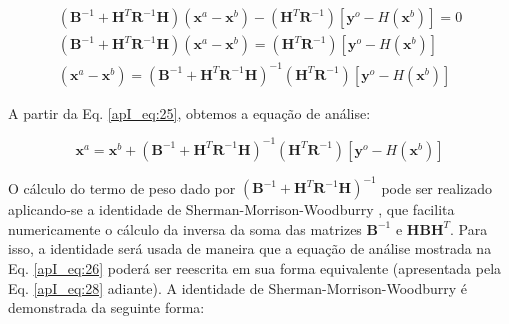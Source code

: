 \begin{align}
  \label{apI_eq:23}
  (\mathbf{B}^{-1} + \mathbf{H}^{T}\mathbf{R}^{-1}\mathbf{H})(\mathbf{x}^{a} - \mathbf{x}^{b}) - (\mathbf{H}^{T}\mathbf{R}^{-1})[\mathbf{y}^{o} - \textit{H}(\mathbf{x}^{b})] = 0 \\
  \label{apI_eq:24}
  (\mathbf{B}^{-1} + \mathbf{H}^{T}\mathbf{R}^{-1}\mathbf{H})(\mathbf{x}^{a} - \mathbf{x}^{b}) = (\mathbf{H}^{T}\mathbf{R}^{-1})[\mathbf{y}^{o} - \textit{H}(\mathbf{x}^{b})] \\
  \label{apI_eq:25}
  (\mathbf{x}^{a} - \mathbf{x}^{b}) = (\mathbf{B}^{-1} + \mathbf{H}^{T}\mathbf{R}^{-1}\mathbf{H})^{-1}{(\mathbf{H}^{T}\mathbf{R}^{-1})[\mathbf{y}^{o} - \textit{H}(\mathbf{x}^{b})]}
\end{align}

A partir da Eq. \ref{apI_eq:25}, obtemos a equação de análise:

\begin{equation}
  \label{apI_eq:26}
    \mathbf{x}^{a} = \mathbf{x}^{b} + (\mathbf{B}^{-1} + \mathbf{H}^{T}\mathbf{R}^{-1}\mathbf{H})^{-1}{(\mathbf{H}^{T}\mathbf{R}^{-1})[\mathbf{y}^{o} - \textit{H}(\mathbf{x}^{b})]}
\end{equation}


O cálculo do termo de peso dado por $(\mathbf{B}^{-1} + \mathbf{H}^{T}\mathbf{R}^{-1}\mathbf{H})^{-1}$ pode ser realizado aplicando-se a identidade de Sherman-Morrison-Woodburry \cite{sherman/1950,woodbury/1950}, que facilita numericamente o cálculo da inversa da soma das matrizes $\mathbf{B}^{-1}$ e  $\mathbf{H}\mathbf{B}\mathbf{H}^{T}$. Para isso, a identidade será usada de maneira que a equação de análise mostrada na Eq. \ref{apI_eq:26} poderá ser reescrita em sua forma equivalente (apresentada pela Eq. \ref{apI_eq:28} adiante). A identidade de Sherman-Morrison-Woodburry é demonstrada da seguinte forma:




